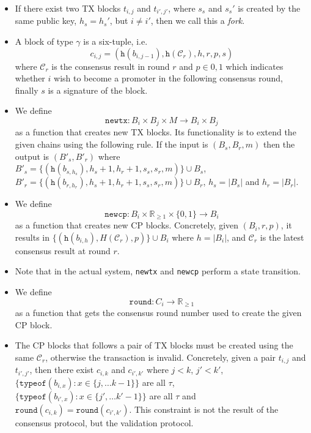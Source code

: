 \begin{itemize}
\item If there exist two TX blocks $t_{i,j}$ and $t_{i',j'}$, where $s_s$ and
  $s_s'$ is created by the same public key, $h_s = h_s'$, but $i \neq i'$, then
  we call this a \emph{fork}.

\item A block of type $\gamma$ is a six-tuple, i.e.
  $$c_{i,j} = (\texttt{h}(b_{i,j-1}), \texttt{h}(\mathcal{C}_r), h, r, p, s)$$
  where $\mathcal{C}_r$ is the consensus result in round $r$ and $p \in {0,1}$
  which indicates whether $i$ wish to become a promoter in the following
  consensus round, finally $s$ is a signature of the block.

\item We define
  $$\texttt{newtx}: B_i \times B_j \times M \rightarrow B_i \times B_j$$
  as a function that creates new TX blocks. Its functionality is to
  extend the given chains using the following rule. If the input is $(B_s, B_r,
  m)$ then the output is $(B'_s, B'_r)$ where $B'_s = \{(\texttt{h}(b_{s,h_s}), h_s + 1,
  h_r + 1, s_s, s_r, m)\} \cup B_s$, $B'_r = \{(\texttt{h}(b_{r, h_r}), h_s + 1, h_r + 1,
  s_s, s_r, m)\} \cup B_r$, $h_s = |B_s|$ and $h_r = |B_r|$.

\item We define
  $$\texttt{newcp}: B_i \times \mathbb{R}_{\ge 1} \times \{0, 1\} \rightarrow B_i$$
  as a function that creates new CP blocks. Concretely, given $(B_i, r, p)$, it
  results in $\{ (\texttt{h}(b_{i,h}), H(\mathcal{C}_r), p) \}\cup B_i$ where $h =
  |B_i|$, and $\mathcal{C}_r$ is the latest consensus result at round $r$.

\item Note that in the actual system, \texttt{newtx} and \texttt{newcp} perform
  a state transition.

\item We define
  $$\texttt{round}: C_i \rightarrow \mathbb{R}_{\ge 1}$$
  as a function that gets the consensus round number used to create the given CP
  block.

\item The CP blocks that follows a pair of TX blocks must be created using the
  same $\mathcal{C}_r$, otherwise the transaction is invalid. Concretely, given
  a pair $t_{i,j}$ and $t_{i',j'}$, then there exist $c_{i, k}$ and $c_{i', k'}$
  where $j < k$, $j' < k'$, $\{ \texttt{typeof}(b_{i, x}) : x \in \{j, \dots k -
  1\}\}$ are all $\tau$, $ \{ \texttt{typeof}(b_{i', x}) : x \in \{ j', \dots k'
  - 1\} \}$ are all $\tau$ and $\texttt{round}(c_{i, k}) = \texttt{round}(c_{i',
    k'})$. This constraint is not the result of the consensus protocol, but the
  validation protocol.


\end{itemize}

